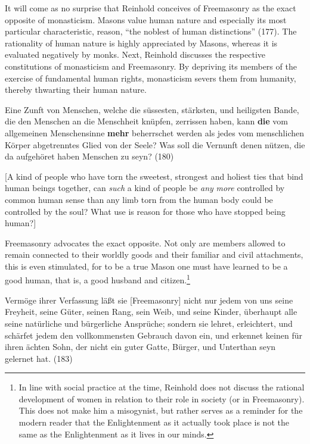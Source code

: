 It will come as no surprise that Reinhold conceives of Freemasonry as the exact opposite of monasticism. Masons value human nature and especially its most particular characteristic, reason, ``the noblest of human distinctions'' (177). The rationality of human nature is highly appreciated by Masons, whereas it is evaluated negatively by monks. Next, Reinhold discusses the respective constitutions of monasticism and Freemasonry. By depriving its members of the exercise of fundamental human rights, monasticism severs them from humanity, thereby thwarting their human nature.

Eine Zunft von Menschen, welche die s\"{u}ssesten, st\"{a}rksten, und heiligsten Bande, die den Menschen an die Menschheit kn\"{u}pfen, zerrissen haben, kann \textbf{die} vom allgemeinen Menschensinne \textbf{mehr} beherrschet werden als jedes vom menschlichen K\"{o}rper abgetrenntes Glied von der Seele? Was soll die Vernunft denen n\"{u}tzen, die da aufgeh\"{o}ret haben Menschen zu seyn? (180) 

[A kind of people who have torn the sweetest, strongest and holiest ties that bind human beings together, can \textit{such} a kind of people be \textit{any} \textit{more} controlled by common human sense than any limb torn from the human body could be controlled by the soul? What use is reason for those who have stopped being human?]

Freemasonry advocates the exact opposite. Not only are members allowed to remain connected to their worldly goods and their familiar and civil attachments, this is even stimulated, for to be a true Mason one must have learned to be a good human, that is, a good husband and citizen.\footnote{ In line with social practice at the time, Reinhold does not discuss the rational development of women in relation to their role in society (or in Freemasonry). This does not make him a misogynist, but rather serves as a reminder for the modern reader that the Enlightenment as it actually took place is not the same as the Enlightenment as it lives in our minds.}

Verm\"{o}ge ihrer Verfassung l\"{a}\ss{}t sie [Freemasonry] nicht nur jedem von uns seine Freyheit, seine G\"{u}ter, seinen Rang, sein Weib, und seine Kinder, \"{u}berhaupt alle seine nat\"{u}rliche und b\"{u}rgerliche Anspr\"{u}che; sondern sie lehret, erleichtert, und sch\"{a}rfet jedem den vollkommensten Gebrauch davon ein, und erkennet keinen f\"{u}r ihren \"{a}chten Sohn, der nicht ein guter Gatte, B\"{u}rger, und Unterthan seyn gelernet hat. (183) 

